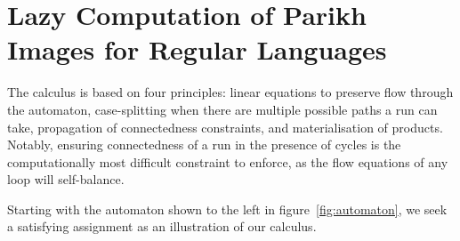 \documentclass{easychair}
\begin{document}
\section{Lazy Computation of Parikh Images for Regular Languages}
The calculus is based on four principles: linear equations to preserve flow
through the automaton, case-splitting when there are multiple possible paths a
run can take, propagation of connectedness constraints, and materialisation of
products. Notably, ensuring connectedness of a run in the presence of cycles is
the computationally most difficult constraint to enforce, as the flow equations
of any loop will self-balance.

Starting with the automaton shown to the left in figure~\ref{fig:automaton}, we
seek a satisfying assignment as an illustration of our calculus.
\end{document}
